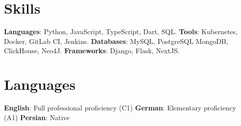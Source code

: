 \documentclass[letterpaper,11pt]{article}
\makeatletter
\newcommand{\resumeItem}[2]{
  \item\small{
    \textbf{#1}{: #2 \vspace{-2pt}}
  }
}
\newcommand{\resumeSubItem}[2]{\resumeItem{#1}{#2}\vspace{-4pt}}
\newcommand{\resumeSubHeadingListStart}{\begin{itemize}[leftmargin=*]}
\newcommand{\resumeSubHeadingListEnd}{\end{itemize}}
\newcommand{\titleWithDescription}[2]{\textbf{#1}{: #2}}
\newcommand{\resumeLanguages}[6]{
  \section{Languages}
    \noindent
    \titleWithDescription{#1}{#2}
    \hfill
    \titleWithDescription{#3}{#4}
    \hfill
    \titleWithDescription{#5}{#6}
}
\newcommand{\certificateItem}[3]{
  \item\begin{tabular*}{0.97\textwidth}{l@{\extracolsep{\fill}}r}
    \small{
      \textbf{#1}{, #2 \vspace{-2pt}}
    } & \textit{\small #3} \\
  \end{tabular*}\vspace{-5pt}
}
\makeatother
\begin{document}




%
\section{Skills}

  \titleWithDescription{Languages}{Python, JavaScript, TypeScript, Dart, SQL.}
  \hfill
  \titleWithDescription{Tools}{Kubernetes, Docker, GitLab CI, Jenkins.}\vspace{3pt}
  \newline
  \titleWithDescription{Databases}{MySQL, PostgreSQL MongoDB, ClickHouse, Neo4J.}
  \hfill
  \titleWithDescription{Frameworks}{Django, Flask, NextJS.}

\resumeLanguages
  {English}
  {Full professional proficiency (C1)}
  {German}
  {Elementary proficiency (A1)}
  {Persian}
  {Native}
\end{document}
